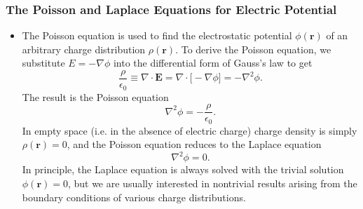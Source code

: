 \documentclass[11pt, a4paper]{article}
\renewcommand{\vec}[1]{\bm{#1}} %
\renewcommand{\r}{\vec{r}}
\newcommand{\E}{\vec{E}} %
\newcommand{\ee}{\epsilon_{0}}  %
\renewcommand{\div}{\nabla \cdot}
\renewcommand{\grad}{\nabla}
\renewcommand{\laplacian}{\nabla^{2}}
\begin{document}
\subsubsection{The Poisson and Laplace Equations for Electric Potential}
\begin{itemize}
	\item The Poisson equation is used to find the electrostatic potential $ \phi(\r) $ of an arbitrary charge distribution $ \rho(\r) $. To derive the Poisson equation, we substitute $ E = - \grad \phi $ into the differential form of Gauss's law to get
	\begin{equation*}
		\frac{\rho}{\ee} \equiv \div \E = \div \big[- \grad \phi \big]= - \laplacian \phi.
	\end{equation*}
	The result is the Poisson equation
	\begin{equation*}
		\laplacian \phi = - \frac{\rho}{\ee}.
	\end{equation*}
	In empty space (i.e. in the absence of electric charge) charge density is simply $ \rho(\r) = 0 $, and the Poisson equation reduces to the Laplace equation
	\begin{equation*}
		\laplacian \phi = 0.
	\end{equation*}
	In principle, the Laplace equation is always solved with the trivial solution $ \phi(\r) = 0 $, but we are usually interested in nontrivial results arising from the boundary conditions of various charge distributions. 
\end{itemize}
\end{document}
